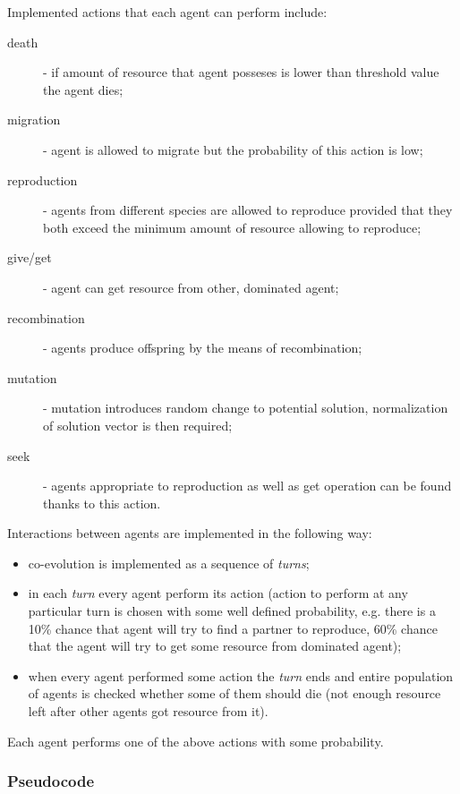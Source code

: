 Implemented actions that each agent can perform include:

\begin{description}
  \item [death]
      - if amount of resource that agent posseses is lower than threshold value the agent dies;
  \item [migration]
      - agent is allowed to migrate but the probability of this action is low;
  \item [reproduction]
      - agents from different species are allowed to reproduce provided that they both exceed the minimum amount of resource allowing to reproduce;
  \item [give/get]
      - agent can get resource from other, dominated agent;
  \item [recombination]
      - agents produce offspring by the means of recombination;
  \item [mutation]
      - mutation introduces random change to potential solution, normalization of solution vector is then required;
  \item [seek]
      - agents appropriate  to reproduction as well as get operation can be found thanks to this action.
\end{description}

Interactions between agents are implemented in the following way:
\begin{itemize}
  \item co-evolution is implemented as a sequence of \emph{turns};
  \item in each \emph{turn} every agent perform its action (action to perform at any particular turn is chosen with some well defined probability, e.g. there is a 10\% chance that agent will try to find
	a partner to reproduce, 60\% chance that the agent will try to get some resource from dominated agent);
  \item when every agent performed some action the \emph{turn} ends and entire population of agents is checked whether some of them should die (not enough resource left after other agents got resource
	from it).
\end{itemize}


Each agent performs one of the above actions with some probability.

\subsubsection{Pseudocode}


